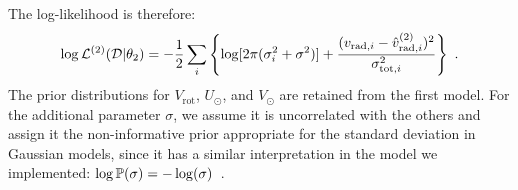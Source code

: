 The log-likelihood is therefore:
\begin{equation}\label{Eq:LogLikeMod2}
    \log \mathbb{\mathcal{L}}^{(2)}(\mathcal{D} \vert \theta_2) = -\frac{1}{2}\sum_i\left\{\log[2\pi(\sigma_{i}^2+\sigma^2)]+\frac{(v_{\text{rad},i} - \hat{v}_{\text{rad},i}^{(2)})^2}{\sigma_{\text{tot}, i}^2}\right\} \text{ .}
\end{equation}
\noindent
The prior distributions for $V_{\text{rot}}$, $U_{\odot}$, and $V_{\odot}$ are retained from the first model. For the additional parameter $\sigma$, we assume it is uncorrelated with the others and assign it the non-informative prior appropriate for the standard deviation in Gaussian models, since it has a similar interpretation in the model we implemented: $\log \mathbb{P} (\sigma) = - \log(\sigma)$~\cite{mackay2003}.
